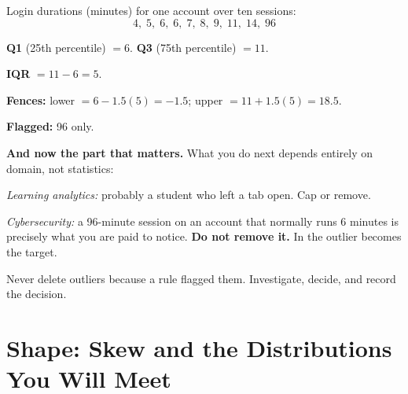 \begin{worked}
Login durations (minutes) for one account over ten sessions:
$$4,\;5,\;6,\;6,\;7,\;8,\;9,\;11,\;14,\;96$$

\textbf{Q1} (25th percentile) $= 6$. \quad \textbf{Q3} (75th percentile) $= 11$.

\textbf{IQR} $= 11 - 6 = 5$.

\textbf{Fences:} lower $= 6 - 1.5(5) = -1.5$; upper $= 11 + 1.5(5) = 18.5$.

\textbf{Flagged:} 96 only.

\smallskip
\textbf{And now the part that matters.} What you do next depends entirely on
domain, not statistics:
\begin{tight}
  \item \emph{Learning analytics:} probably a student who left a tab open. Cap or
        remove.
  \item \emph{Cybersecurity:} a 96-minute session on an account that normally runs
        6 minutes is precisely what you are paid to notice. \textbf{Do not
        remove it.} In  the outlier becomes the target.
\end{tight}
Never delete outliers because a rule flagged them. Investigate, decide, and record
the decision.
\end{worked}

\section{Shape: Skew and the Distributions You Will Meet}

